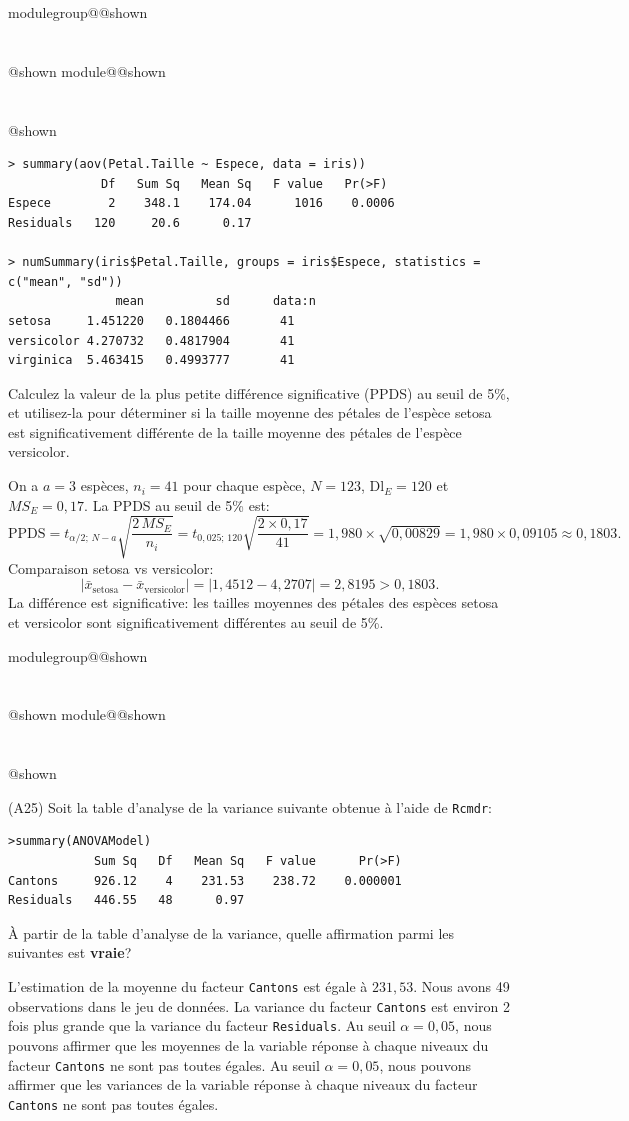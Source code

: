 \documentclass{Evaluation}
\makeatletter
\newcommand{\currentmodulekey}{}
\newcommand{\currentmoduletitle}{}
\newcommand{\currentgroupkey}{}
\newcommand{\currentgrouptitle}{}
\newcommand{\showmoduleifneeded}{%
  \ifx\currentgroupkey\empty\else
    \expandafter\ifx\csname modulegroup@\currentgroupkey @shown\endcsname\relax
      \section*{\currentgrouptitle}%
      \expandafter\gdef\csname modulegroup@\currentgroupkey @shown\endcsname{1}%
    \fi
  \fi
  \expandafter\ifx\csname module@\currentmodulekey @shown\endcsname\relax
    \section*{\currentmoduletitle}%
    \expandafter\gdef\csname module@\currentmodulekey @shown\endcsname{1}%
  \fi
}
\newenvironment{A25}{\showmoduleifneeded}{}
\makeatother
\begin{document}
\begin{questions}
\begin{A25}
\begin{verbatim}
> summary(aov(Petal.Taille ~ Espece, data = iris))
             Df   Sum Sq   Mean Sq   F value   Pr(>F)    
Espece        2    348.1    174.04      1016    0.0006
Residuals   120     20.6      0.17  

> numSummary(iris$Petal.Taille, groups = iris$Espece, statistics = c("mean", "sd"))
               mean          sd      data:n
setosa     1.451220   0.1804466       41
versicolor 4.270732   0.4817904       41
virginica  5.463415   0.4993777       41
\end{verbatim}


Calculez la valeur de la plus petite différence significative (PPDS) au seuil de 5\%, et utilisez-la 
pour déterminer si la taille moyenne des pétales de l'espèce setosa est significativement différente de la taille
moyenne des pétales de l'espèce versicolor.

\begin{solution}
On a $a=3$ espèces, $n_i=41$ pour chaque espèce, $N=123$, $\text{Dl}_E=120$ et $MS_E=0{,}17$. La PPDS au seuil de 5\% est:
$$\text{PPDS} = t_{\alpha/2;\,N-a}\sqrt{\frac{2\,MS_E}{n_i}} = t_{0{,}025;\,120}\sqrt{\frac{2 \times 0{,}17}{41}} = 1{,}980 \times \sqrt{0{,}00829} = 1{,}980 \times 0{,}09105 \approx 0{,}1803.$$
Comparaison setosa vs versicolor:
$$|\bar{x}_{\text{setosa}} - \bar{x}_{\text{versicolor}}| = |1{,}4512 - 4{,}2707| = 2{,}8195 > 0{,}1803.$$
La différence est significative: les tailles moyennes des pétales des espèces setosa et versicolor sont significativement différentes au seuil de 5\%.
\end{solution}
\end{A25}


\begin{A25}
\question (A25) Soit la table d'analyse de la variance suivante obtenue à l'aide de \texttt{Rcmdr}:
\begin{verbatim}
>summary(ANOVAModel)
            Sum Sq   Df   Mean Sq   F value      Pr(>F)    
Cantons     926.12    4    231.53    238.72    0.000001 
Residuals   446.55   48      0.97
\end{verbatim}

À partir de la table d'analyse de la variance, quelle affirmation parmi les suivantes est \textbf{vraie}?



\begin{checkboxes}
\choice L'estimation de la moyenne du facteur \texttt{Cantons} est égale à $231,53$. 
\choice Nous avons 49 observations dans le jeu de données.
\choice La variance du facteur \texttt{Cantons} est environ 2 fois plus grande que la variance du facteur \texttt{Residuals}.
\correctchoice Au seuil $\alpha=0,05$, nous pouvons affirmer que les moyennes de la variable réponse à chaque niveaux du facteur \texttt{Cantons} ne sont pas toutes égales.
\choice Au seuil $\alpha=0,05$, nous pouvons affirmer que les variances de la variable réponse à chaque niveaux du facteur \texttt{Cantons} ne sont pas toutes égales.
\end{checkboxes}


\end{A25}
\end{questions}
\end{document}
